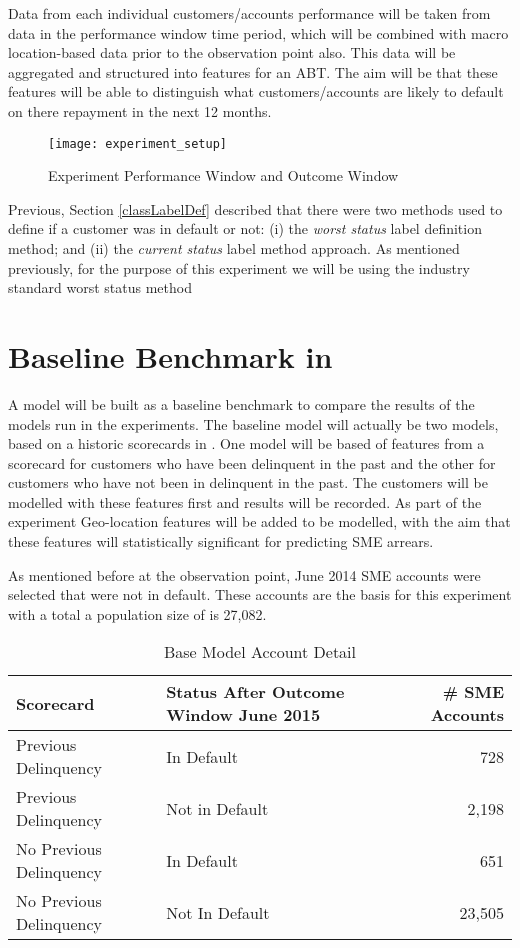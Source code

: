 Data from each individual customers/accounts performance will be taken from data in the performance window time period, which will be combined with macro location-based data prior to the observation point also. This data will be aggregated and structured into features for an ABT. The aim will be that these features will be able to distinguish what customers/accounts are likely to default on there repayment in the next 12 months. 

\begin{figure}[h!]
	\texttt{[image: experiment\_setup]}
	\caption[Experiment Performance Window and Outcome Window]
	{Experiment Performance Window and Outcome Window}
	\label{fig:experiment_setup}
\end{figure}

Previous, Section \ref{classLabelDef} described that there were two methods used to define if a customer was in default or not: (i) the \textit{worst status} label definition method; and (ii) the \textit{current status} label method approach. As mentioned previously, for the purpose of this experiment we will be using the industry standard worst status method

\section{Baseline Benchmark in \subjectname\ }
A model will be built as a baseline benchmark to compare the results of the models run in the experiments. The baseline model will actually be two models, based on a historic scorecards in \subjectname. One model will be based of features from a scorecard for customers who have been delinquent in the past and the other for customers who have not been in delinquent in the past. The customers will be modelled with these features first and results will be recorded. As part of the experiment Geo-location features will be added to be modelled, with the aim that these features will statistically significant for predicting SME arrears. 

As mentioned before at the observation point, June 2014 SME accounts were selected that were not in default. These accounts are the basis for this experiment with a total a population size of is 27,082. 


\begin{table}[H]
	\centering
	\begin{tabular}{l p{5cm} r}
		\hline
		\textbf{Scorecard} & \textbf{Status After Outcome Window June 2015} & \textbf{\# SME Accounts} \\
		\hline
		Previous Delinquency          & In Default        & 728 \\
		Previous Delinquency          & Not in Default        & 2,198 \\ 
		No Previous Delinquency          & In Default        & 651 \\ 
		No Previous Delinquency          & Not In Default        & 23,505 \\
	\end{tabular}
	\caption{Base Model Account Detail}
\end{table}

